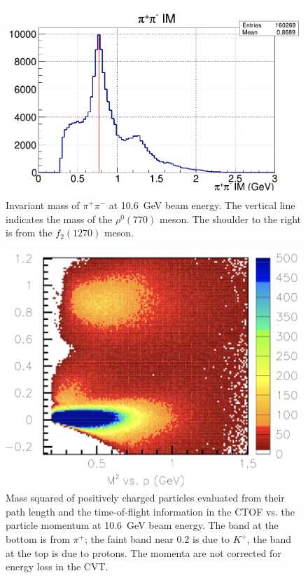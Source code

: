 \documentclass[final,3p,twocolumn]{elsarticle}
\begin{document}
\begin{figure}[t!]
\vspace{0.3cm}\centerline{\includegraphics[width=1.0\columnwidth]{rhoMass.png}}
\caption{Invariant mass of $\pi^+\pi^-$ at 10.6~GeV beam energy. The vertical line indicates the mass of the
  $\rho^0(770)$ meson. The shoulder to the right is from the $f_2(1270)$ meson.}
\label{pip-pim-p}
\end{figure} 

\begin{figure}[t!]
\centerline{\includegraphics[width=1.\columnwidth]{ctof-pid-3.png}}
\caption{Mass squared of positively charged particles evaluated from their path length and the time-of-flight
  information in the CTOF vs. the particle momentum at 10.6~GeV beam energy. The band at the bottom is from
  $\pi^+$; the faint band near 0.2 is due to $K^+$, the band at the top is due to protons. The momenta are not
  corrected for energy loss in the CVT.}
\label{CD-PID}
\end{figure} 
\end{document}

